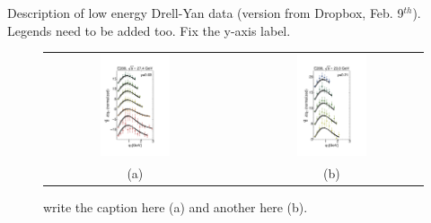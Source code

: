 \documentclass[aps,preprintnumbers,showpacs,nofootinbib,superscriptaddress,floatfix]{revtex4}
\begin{document}
Description of low energy Drell-Yan data (version from Dropbox, Feb. 9$^{th}$).
Legends need to be added too. Fix the y-axis label.
\begin{figure}[h!]
\centering
\begin{tabular}{ccc}
\includegraphics[width=0.40\textwidth]{plots/DY-Z/DY_SCIplot_flINDEP_1.pdf}
&\hspace{0.001cm}
&
\includegraphics[width=0.40\textwidth]{plots/DY-Z/DY_SCIplot_flINDEP_2.pdf}
\\
(a) && (b)
\end{tabular}
\caption{write the caption here (a) and another here (b).}
\label{f:DY_panel_1}
\end{figure}
\end{document}

